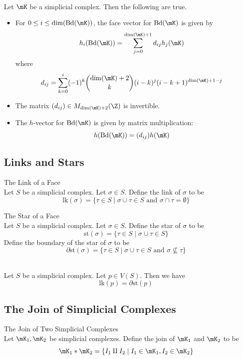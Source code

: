 \documentclass[a4paper]{article}
\begin{document}
\begin{prp}{}{}\\
Let $\mK$ be a simplicial complex. Then the following are true. 
\begin{itemize}
\item For $0\leq i\leq\dim(\text{Bd}(\mK))$, the face vector for $\text{Bd}(\mK)$ is given by $$h_i(\text{Bd}(\mK))=\sum_{j=0}^{\dim(\mK)+1}d_{ij}h_j(\mK)$$ where $$d_{ij}=\sum_{k=0}^i(-1)^k\binom{\dim(\mK)+2}{k}(i-k)^j(i-k+1)^{\dim(\mK)+1-j}$$
\item The matrix $(d_{ij})\in M_{\dim(\mK)+2}(\Z)$ is invertible. 
\item The $h$-vector for $\text{Bd}(\mK)$ is given by matrix multiplication: $$h(\text{Bd}(\mK))=(d_{ij})h(\mK)$$
\end{itemize}
\end{prp}

\subsection{Links and Stars}
\begin{defn}{The Link of a Face}{}\\
Let $S$ be a simplicial complex. Let $\sigma\in S$. Define the link of $\sigma$ to be $$\text{lk}(\sigma)=\{\tau\in S\;|\;\sigma\cup\tau\in S\text{ and }\sigma\cap\tau=\emptyset\}$$
\end{defn}

\begin{defn}{The Star of a Face}{}\\
Let $S$ be a simplicial complex. Let $\sigma\in S$. Define the star of $\sigma$ to be $$\text{st}(\sigma)=\{\tau\in S\;|\;\sigma\cup\tau\in S\}$$ Define the boundary of the star of $\sigma$ to be $$\partial\text{st}(\sigma)=\{\tau\in S\;|\;\sigma\cup\tau\in S\text{ and }\sigma\not\subseteq\tau\}$$
\end{defn}

\begin{lmm}{}{}\\
Let $S$ be a simplicial complex. Let $p\in V(S)$. Then we have $$\text{lk}(p)=\partial\text{st}(p)$$
\end{lmm}

\subsection{The Join of Simplicial Complexes}
\begin{defn}{The Join of Two Simplicial Complexes}{}\\
Let $\mK_1,\mK_2$ be simplicial complexes. Define the join of $\mK_1$ and $\mK_2$ to be $$\mK_1\ast\mK_2=\{I_1\amalg I_2\;|\;I_1\in\mK_1,I_2\in\mK_2\}$$
\end{defn}
\end{document}
